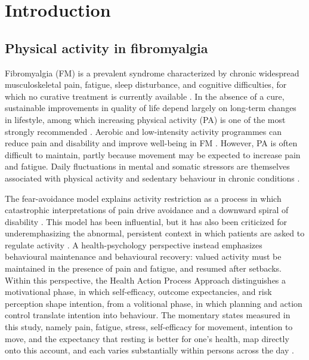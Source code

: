 \documentclass[11pt,a4paper]{article}
\begin{document}
\section{Introduction}

\subsection{Physical activity in fibromyalgia}
Fibromyalgia (FM) is a prevalent syndrome characterized by chronic widespread
musculoskeletal pain, fatigue, sleep disturbance, and cognitive difficulties, for which no
curative treatment is currently available \citep{wolfe2016revisions,hauser2015fibromyalgia}. In the absence of a
cure, sustainable improvements in quality of life depend largely on long-term changes in
lifestyle, among which increasing physical activity (PA) is one of the most strongly
recommended \citep{ambrose2015physical,geneen2017physical}. Aerobic and low-intensity
activity programmes can reduce pain and disability and improve well-being in FM
\citep{busch2007exercise}. However, PA is often difficult to maintain, partly because
movement may be expected to increase pain and fatigue. Daily fluctuations in mental and
somatic stressors are themselves associated with physical activity and sedentary behaviour
in chronic conditions \citep{poppe2021impact}.

The fear-avoidance model explains activity restriction as a process in which catastrophic
interpretations of pain drive avoidance and a downward spiral of disability
\citep{vlaeyen2000fear,leeuw2007fear}. This model has been influential, but it has also
been criticized for underemphasizing the abnormal, persistent context in which patients are
asked to regulate activity \citep{crombez2012fear}. A health-psychology perspective instead
emphasizes behavioural maintenance and behavioural recovery: valued activity must be
maintained in the presence of pain and fatigue, and resumed after setbacks. Within this
perspective, the Health Action Process Approach
\citep[HAPA;][]{schwarzer2008modeling,zhang2019predicting} distinguishes a motivational
phase, in which self-efficacy, outcome expectancies, and risk perception shape intention,
from a volitional phase, in which planning and action control translate intention into
behaviour. The momentary states measured in this study, namely pain, fatigue, stress,
self-efficacy for movement, intention to move, and the expectancy that resting is better for
one's health, map directly onto this account, and each varies substantially within persons
across the day \citep{maes2022variability}.
\end{document}
